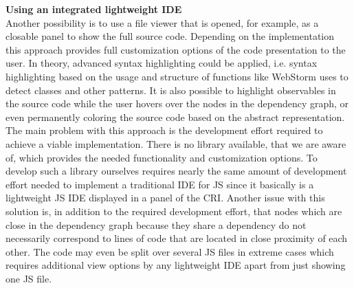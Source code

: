 \textbf{Using an integrated lightweight IDE}\\
Another possibility is to use a file viewer that is opened, for example, as a closable panel to show the full source code. Depending on the implementation this approach provides full customization options of the code presentation to the user. In theory, advanced syntax highlighting could be applied, i.e. syntax highlighting based on the usage and structure of functions like WebStorm uses to detect classes and other patterns. It is also possible to highlight observables in the source code while the user hovers over the nodes in the dependency graph, or even permanently coloring the source code based on the abstract representation. The main problem with this approach is the development effort required to achieve a viable implementation. There is no library available, that we are aware of, which provides the needed functionality and customization options. To develop such a library ourselves requires nearly the same amount of development effort needed to implement a traditional IDE for JS since it basically is a lightweight JS IDE displayed in a panel of the CRI. Another issue with this solution is, in addition to the required development effort, that nodes which are close in the dependency graph because they share a dependency do not necessarily correspond to lines of code that are located in close proximity of each other. The code may even be split over several JS files in extreme cases which requires additional view options by any lightweight IDE apart from just showing one JS file.\\

